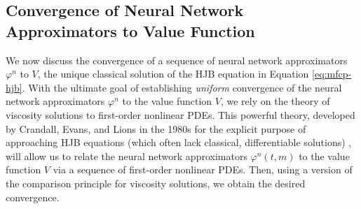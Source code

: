 \documentclass[11pt,reqno]{amsart}
\numberwithin{equation}{section}
\theoremstyle{plain}
\begin{document}
\subsection{Convergence of Neural Network Approximators to Value Function}
\label{sec:nn-convergence}
We now discuss the convergence of a sequence of neural network approximators $\varphi^n$ to $V$, the unique classical solution of the HJB equation in Equation \eqref{eq:mfcp-hjb}. With the ultimate goal of establishing \textit{uniform} convergence of the neural network approximators $\varphi^n$ to the value function $V$, we rely on the theory of viscosity solutions to first-order nonlinear PDEs. This powerful theory, developed by Crandall, Evans, and Lions in the 1980s for the explicit purpose of approaching HJB equations (which often lack classical, differentiable solutions) \cite{visc-users}, will allow us to relate the neural network approximators $\varphi^n(t,m)$ to the value function $V$ via a sequence of first-order nonlinear PDEs. Then, using a version of the comparison principle for viscosity solutions, we obtain the desired convergence.
\end{document}
